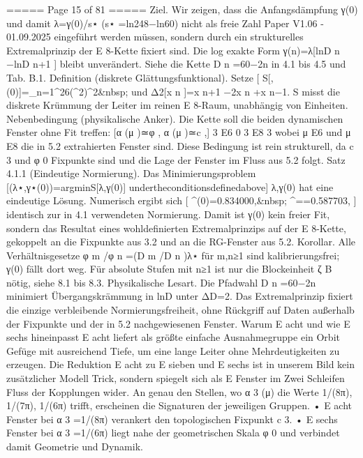 \begin{MyVerbatim}
===== Page 15 of 81 =====
Ziel. Wir zeigen, dass die Anfangsdämpfung γ(0) und damit λ=γ(0)/s⋆ (s⋆ =ln248−ln60) nicht als freie Zahl
Paper V1.06 - 01.09.2025
eingeführt werden müssen, sondern durch ein strukturelles Extremalprinzip der E 8-Kette fixiert sind. Die log exakte
Form γ(n)=λ[lnD n −lnD n+1 ] bleibt unverändert. Siehe die Kette D n =60−2n in 4.1 bis 4.5 und Tab. B.1.
Definition (diskrete Glättungsfunktional). Setze
[ \mathcal S[\lambda,\gamma(0)]=\sum_{n=1}^{26}\Big(\Delta^{2}\Big)^{2}\quad{}\quad&nbsp; \ln\va
und Δ2[x n ]=x n+1 −2x n +x n−1. S misst die diskrete Krümmung der Leiter im reinen E 8-Raum, unabhängig von
Einheiten.
Nebenbedingung (physikalische Anker). Die Kette soll die beiden dynamischen Fenster ohne Fit treffen:
[α (μ )≃φ , α (μ )≃c ,]
3 E6 0 3 E8 3
wobei μ E6 und μ E8 die in 5.2 extrahierten Fenster sind. Diese Bedingung ist rein strukturell, da c 3 und φ 0 Fixpunkte sind
und die Lage der Fenster im Fluss aus 5.2 folgt.
Satz 4.1.1 (Eindeutige Normierung). Das Minimierungsproblem
[(λ⋆,γ⋆(0))=argmin{S[λ,γ(0)]} undertheconditionsdefinedabove]
λ,γ(0)
hat eine eindeutige Lösung. Numerisch ergibt sich
[ \gamma^{\star}(0)=0.834000,\qquad&nbsp; \lambda^{\star}==0.587703, ]
identisch zur in 4.1 verwendeten Normierung. Damit ist γ(0) kein freier Fit, sondern das Resultat eines wohldefinierten
Extremalprinzips auf der E 8-Kette, gekoppelt an die Fixpunkte aus 3.2 und an die RG-Fenster aus 5.2.
Korollar. Alle Verhältnisgesetze φ m /φ n =(D m /D n )λ⋆ für m,n≥1 sind kalibrierungsfrei; γ(0) fällt dort weg. Für absolute
Stufen mit n≥1 ist nur die Blockeinheit ζ B nötig, siehe 8.1 bis 8.3.
Physikalische Lesart. Die Pfadwahl D n =60−2n minimiert Übergangskrämmung in lnD unter ΔD=2. Das
Extremalprinzip fixiert die einzige verbleibende Normierungsfreiheit, ohne Rückgriff auf Daten außerhalb der Fixpunkte
und der in 5.2 nachgewiesenen Fenster.
Warum E acht und wie E sechs hineinpasst
E acht liefert als größte einfache Ausnahmegruppe ein Orbit Gefüge mit ausreichend Tiefe, um eine lange Leiter ohne
Mehrdeutigkeiten zu erzeugen. Die Reduktion E acht zu E sieben und E sechs ist in unserem Bild kein zusätzlicher
Modell Trick, sondern spiegelt sich als E Fenster im Zwei Schleifen Fluss der Kopplungen wider. An genau den Stellen,
wo α 3 (μ) die Werte 1/(8π), 1/(7π), 1/(6π) trifft, erscheinen die Signaturen der jeweiligen Gruppen.
• E acht Fenster bei α 3 =1/(8π) verankert den topologischen Fixpunkt c 3.
• E sechs Fenster bei α 3 =1/(6π) liegt nahe der geometrischen Skala φ 0 und verbindet damit Geometrie und Dynamik.

\end{MyVerbatim}
